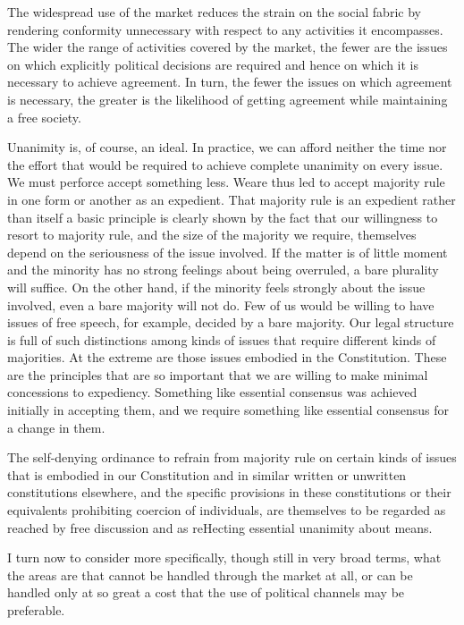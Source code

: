 \documentclass[11pt,openany]{book}
\begin{document}
The widespread use of the market reduces the strain on the social fabric by rendering conformity unnecessary with respect to any activities it encompasses. The wider the range of activities covered by the market, the fewer are the issues on which explicitly political decisions are required and hence on which it is necessary to achieve agreement. In turn, the fewer the issues on which agreement is necessary, the greater is the likelihood of getting agreement while maintaining a free society.

Unanimity is, of course, an ideal. In practice, we can afford neither the time nor the effort that would be required to achieve complete unanimity on every issue. We must perforce accept something less. Weare thus led to accept majority rule in one form or another as an expedient. That majority rule is an expedient rather than itself a basic principle is clearly shown by the fact that our willingness to resort to majority rule, and the size of the majority we require, themselves depend on the seriousness of the issue involved. If the matter is of little moment and the minority has no strong feelings about being overruled, a bare plurality will suffice. On the other hand, if the minority feels strongly about the issue involved, even a bare majority will not do. Few of us would be willing to have issues of free speech, for example, decided by a bare majority. Our legal structure is full of such distinctions among kinds of issues that require different kinds of majorities. At the extreme are those issues embodied in the Constitution. These are the principles that are so important that we are willing to make minimal concessions to expediency. Something like essential consensus was achieved initially in accepting them, and we require something like essential consensus for a change in them.

The self-denying ordinance to refrain from majority rule on certain kinds of issues that is embodied in our Constitution and in similar written or unwritten constitutions elsewhere, and the specific provisions in these constitutions or their equivalents prohibiting coercion of individuals, are themselves to be regarded as reached by free discussion and as reHecting essential unanimity about means.

I turn now to consider more specifically, though still in very broad terms, what the areas are that cannot be handled through the market at all, or can be handled only at so great a cost that the use of political channels may be preferable.
\end{document}
